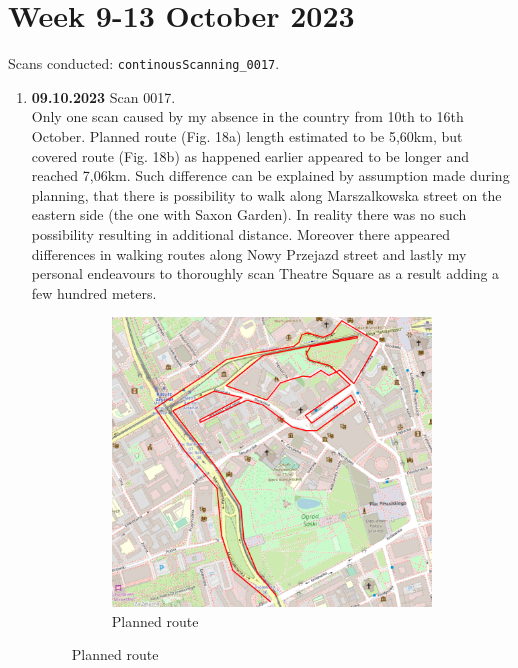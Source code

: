 \documentclass[a4paper,12pt]{book}
\begin{document}
\section{Week 9-13 October 2023}
Scans conducted: \verb|continousScanning_0017|.\\
\begin{enumerate}
	\item \textbf{09.10.2023} Scan 0017. \\
	Only one scan caused by my absence in the country from 10th to 16th October. Planned route (Fig. 18a) length estimated to be 5,60km, but covered route (Fig. 18b) as happened earlier appeared to be longer and reached 7,06km. Such difference can be explained by assumption made during planning, that there is possibility to walk along Marszalkowska street on the eastern side (the one with Saxon Garden). In reality there was no such possibility resulting in additional distance. Moreover there appeared differences in walking routes along Nowy Przejazd street and lastly my personal endeavours to thoroughly scan Theatre Square as a result adding a few hundred meters.
	\begin{figure}[H]
		\centering
		\begin{subfigure}{.75\textwidth}
			\centering
			\includegraphics[width=1\linewidth]{route_p17}
			\caption{Planned route}
			\label{fig:a17}
		\end{subfigure}%
		\linebreak

\end{figure}
\end{enumerate}
\end{document}
